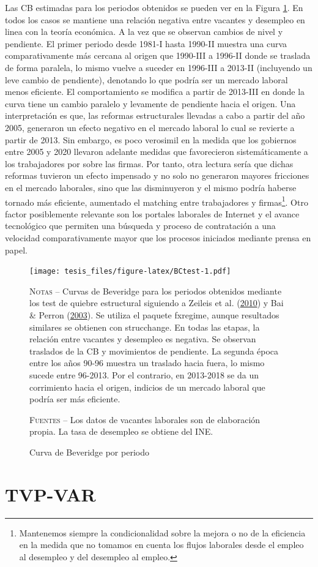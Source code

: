 \documentclass[12pt,oneside]{reedthesis}
\begin{document}
Las CB estimadas para los periodos obtenidos se pueden ver en la Figura \ref{fig:BCtest}. En todos los casos se mantiene una relación negativa entre vacantes y desempleo en linea con la teoría económica. A la vez que se observan cambios de nivel y pendiente. El primer periodo desde 1981-I hasta 1990-II muestra una curva comparativamente más cercana al origen que 1990-III a 1996-II donde se traslada de forma paralela, lo mismo vuelve a suceder en 1996-III a 2013-II (incluyendo un leve cambio de pendiente), denotando lo que podría ser un mercado laboral menos eficiente. El comportamiento se modifica a partir de 2013-III en donde la curva tiene un cambio paralelo y levamente de pendiente hacia el origen. Una interpretación es que, las reformas estructurales llevadas a cabo a partir del año 2005, generaron un efecto negativo en el mercado laboral lo cual se revierte a partir de 2013. Sin embargo, es poco verosimil en la medida que los gobiernos entre 2005 y 2020 llevaron adelante medidas que favorecieron sistemáticamente a los trabajadores por sobre las firmas. Por tanto, otra lectura sería que dichas reformas tuvieron un efecto impensado y no solo no generaron mayores fricciones en el mercado laborales, sino que las disminuyeron y el mismo podría haberse tornado más eficiente, aumentado el matching entre trabajadores y firmas\footnote{Mantenemos siempre la condicionalidad sobre la mejora o no de la eficiencia en la medida que no tomamos en cuenta los flujos laborales desde el empleo al desempleo y del desempleo al empleo.}. Otro factor posiblemente relevante son los portales laborales de Internet y el avance tecnológico que permiten una búsqueda y proceso de contratación a una velocidad comparativamente mayor que los procesos iniciados mediante prensa en papel.
\begin{figure}
\texttt{[image: tesis\_files/figure-latex/BCtest-1.pdf]}
\caption{Curva de Beveridge por periodo}\label{fig:BCtest}\textsc{}

\footnotesize\textsc{Notas} -- Curvas de Beveridge para los periodos obtenidos mediante los test de quiebre estructural siguiendo a Zeileis et al. (\protect\hyperlink{ref-Zeileis2010}{2010}) y Bai \& Perron (\protect\hyperlink{ref-BaiPerron2003}{2003}). Se utiliza el paquete fxregime, aunque resultados similares se obtienen con strucchange. En todas las etapas, la relación entre vacantes y desempleo es negativa. Se observan traslados de la CB y movimientos de pendiente. La segunda época entre los años 90-96 muestra un traslado hacia fuera, lo mismo sucede entre 96-2013. Por el contrario, en 2013-2018 se da un corrimiento hacia el origen, indicios de un mercado laboral que podría ser más eficiente.

\textsc{Fuentes} -- Los datos de vacantes laborales son de elaboración propia. La tasa de desempleo se obtiene del INE.
\end{figure}
\hypertarget{tvp-var-1}{%
\section{TVP-VAR}\label{tvp-var-1}}
\end{document}
